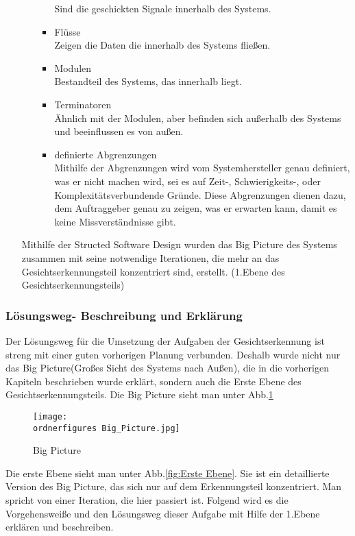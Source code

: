 \begin{enumerate}
\begin{itemize}
\begin{itemize}
			Sind die geschickten Signale innerhalb des Systems.
			\item Flüsse \\
			Zeigen die Daten die innerhalb des Systems fließen.
			\item Modulen \\
			Bestandteil des Systems, das innerhalb liegt.
			\item Terminatoren \\
			Ähnlich mit der Modulen, aber befinden sich außerhalb des Systems und beeinflussen es von außen.
			\item definierte Abgrenzungen \\
			Mithilfe der Abgrenzungen wird vom Systemhersteller genau definiert, was er nicht machen wird, sei es auf Zeit-, Schwierigkeits-, oder Komplexitätsverbundende Gründe. Diese Abgrenzungen dienen dazu, dem Auftraggeber genau zu zeigen, was er erwarten kann, damit es keine Missverständnisse gibt.
			\cite{StructedDesign}
		\end{itemize}
	\end{itemize}
	Mithilfe der Structed Software Design wurden das Big Picture des Systems zusammen mit seine notwendige Iterationen, die mehr an das Gesichtserkennungsteil konzentriert sind, erstellt. (1.Ebene des Gesichtserkennungsteils)
\end{enumerate}
\subsubsection{Lösungsweg- Beschreibung und Erklärung}
Der Lösungsweg für die Umsetzung der Aufgaben der Gesichtserkennung ist streng mit einer guten vorherigen Planung verbunden. Deshalb wurde nicht nur das Big Picture(Großes Sicht des Systems nach Außen), die in die vorherigen Kapiteln beschrieben wurde erklärt, sondern auch die Erste Ebene des Gesichtserkennungsteils.
Die Big Picture sieht man unter Abb.\ref{fig:Big Picture}
\begin{figure}[H]
	\texttt{[image: \\ordnerfigures Big\_Picture.jpg]}
	\caption{Big Picture}
	\label{fig:Big Picture}
\end{figure}	
Die erste Ebene sieht man unter Abb.\ref{fig:Erste Ebene}. Sie ist ein detaillierte Version des Big Picture, das sich nur auf dem Erkennungsteil konzentriert. Man spricht von einer Iteration, die hier passiert ist.  Folgend wird es die Vorgehensweiße und den Lösungsweg dieser Aufgabe mit Hilfe der 1.Ebene erklären und beschreiben.\\

